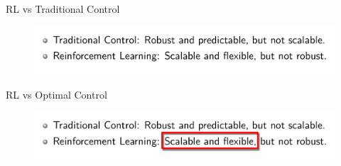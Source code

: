 \begin{frame}{RL vs Traditional Control}
    \begin{figure}
        \centering
        \includegraphics[width=\textwidth]{img/rl_vs_oc.png}
      \end{figure}
\end{frame}
\begin{frame}{RL vs Optimal Control}

    \begin{figure}
        \centering
        \includegraphics[width=\textwidth]{img/rl_vs_oc_annotated.png}
      \end{figure}
\end{frame}